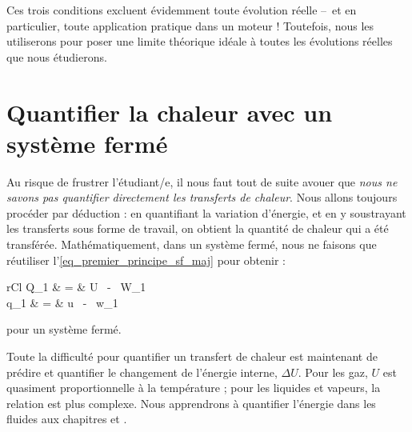 		Ces trois conditions excluent évidemment toute évolution réelle --\ et en particulier, toute application pratique dans un moteur ! Toutefois, nous les utiliserons pour poser une limite théorique idéale à toutes les évolutions réelles que nous étudierons.


\onlyframabook{\clearpage}
\section[Quantifier la chaleur avec un système fermé]{Quantifier la chaleur avec un système\onlyamphibook{\\} fermé}

		Au risque de frustrer l’étudiant/e, il nous faut tout de suite avouer que \emph{nous ne savons pas quantifier directement les transferts de chaleur}. Nous allons toujours procéder par déduction : en quantifiant la variation d’énergie, et en y soustrayant les transferts sous forme de travail, on obtient la quantité de chaleur qui a été transférée. Mathématiquement, dans un système fermé, nous ne faisons que réutiliser l’\cref{eq_premier_principe_sf_maj} pour obtenir :
	\begin{IEEEeqnarray}{rCl}
		Q_{1 } 	& = & 	\Delta U \ - \  W_{1 } \\
		q_{1 } 	& = & 	\Delta u \ - \  w_{1 }
	\end{IEEEeqnarray}
	\begin{equationterms}
		\item pour un système fermé.
	\end{equationterms}
		
		Toute la difficulté pour quantifier un transfert de chaleur est maintenant de prédire et quantifier le changement de l’énergie interne, $\Delta U$. Pour les gaz, $U$ est quasiment proportionnelle à la température ; pour les liquides et vapeurs, la relation est plus complexe. Nous apprendrons à quantifier l’énergie dans les fluides aux chapitres \coursquatreplural et \courscinqplural.
